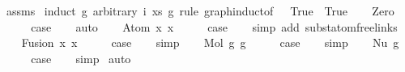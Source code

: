\begin{isabellebody}
\ assms\isanewline
{}\isamarkupfalse%
\ {\isacharparenleft}{\kern0pt}induct\ g\ arbitrary{\isacharcolon}{\kern0pt}\ i\ xs\ g{}\ rule{\isacharcolon}{\kern0pt}\ graph{\isachardot}{\kern0pt}induct{\isacharbrackleft}{\kern0pt}of\ {\isacharunderscore}{\kern0pt}\ {\isachardoublequoteopen}{\isacharpercent}{\kern0pt}{\isacharunderscore}{\kern0pt}{\isachardot}{\kern0pt}\ True{\isachardoublequoteclose}\ {\isachardoublequoteopen}{\isacharpercent}{\kern0pt}{\isacharunderscore}{\kern0pt}{\isachardot}{\kern0pt}\ True{\isachardoublequoteclose}{\isacharbrackright}{\kern0pt}{\isacharparenright}{\kern0pt}\isanewline
\ \ \isamarkupfalse%
\ Zero\isanewline
\ \ \isamarkupfalse%
\ \isamarkupfalse%
\ {\isacharquery}{\kern0pt}case\isanewline
\ \ \isamarkupfalse%
\ auto\isanewline
{}\isamarkupfalse%
\isanewline
\ \ \isamarkupfalse%
\ {\isacharparenleft}{\kern0pt}Atom\ x{}\ x{}{\isacharparenright}{\kern0pt}\isanewline
\ \ \isamarkupfalse%
\ \isamarkupfalse%
\ {\isacharquery}{\kern0pt}case\isanewline
\ \ \isamarkupfalse%
\ {\isacharparenleft}{\kern0pt}simp\ add{\isacharcolon}{\kern0pt}\ subst{\isacharunderscore}{\kern0pt}atom{\isacharunderscore}{\kern0pt}freelinks{\isacharparenright}{\kern0pt}\isanewline
{}\isamarkupfalse%
\isanewline
\ \ \isamarkupfalse%
\ {\isacharparenleft}{\kern0pt}Fusion\ x{}\ x{}{\isacharparenright}{\kern0pt}\isanewline
\ \ \isamarkupfalse%
\ \isamarkupfalse%
\ {\isacharquery}{\kern0pt}case\isanewline
\ \ \isamarkupfalse%
\ simp\isanewline
{}\isamarkupfalse%
\isanewline
\ \ \isamarkupfalse%
\ {\isacharparenleft}{\kern0pt}Mol\ g{}\ g{}{\isacharparenright}{\kern0pt}\isanewline
\ \ \isamarkupfalse%
\ \isamarkupfalse%
\ {\isacharquery}{\kern0pt}case\isanewline
\ \ \isamarkupfalse%
\ simp\isanewline
{}\isamarkupfalse%
\isanewline
\ \ \isamarkupfalse%
\ {\isacharparenleft}{\kern0pt}Nu\ g{\isacharparenright}{\kern0pt}\isanewline
\ \ \isamarkupfalse%
\ \isamarkupfalse%
\ {\isacharquery}{\kern0pt}case\isanewline
\ \ \isamarkupfalse%
\ simp\isanewline
{}\isamarkupfalse%
\ auto%

\end{isabellebody}
